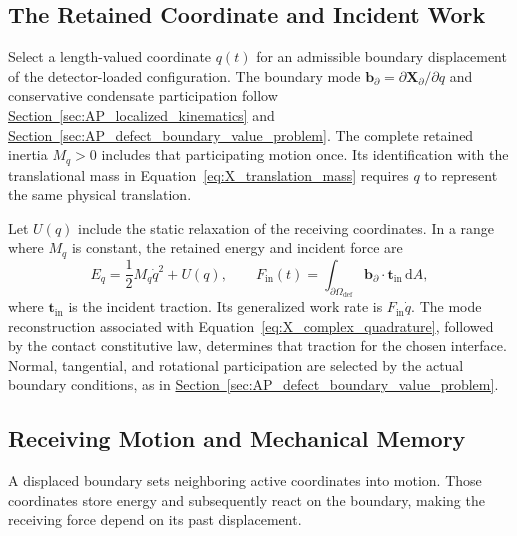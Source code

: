 \subsection{The Retained Coordinate and Incident Work}
\label{sec:Y_boundary_work}

Select a length-valued coordinate $q(t)$ for an admissible boundary displacement of the detector-loaded configuration. The boundary mode $\mathbf b_{\partial}=\partial\mathbf X_{\partial}/\partial q$ and conservative condensate participation follow \hyperref[sec:AP_localized_kinematics]{Section~\ref*{sec:AP_localized_kinematics}} and \hyperref[sec:AP_defect_boundary_value_problem]{Section~\ref*{sec:AP_defect_boundary_value_problem}}. The complete retained inertia $M_q>0$ includes that participating motion once. Its identification with the translational mass in Equation~\eqref{eq:X_translation_mass} requires $q$ to represent the same physical translation.

Let $U(q)$ include the static relaxation of the receiving coordinates. In a range where $M_q$ is constant, the retained energy and incident force are
\begin{equation}
    E_q=\frac12M_q\dot q^2+U(q),
    \qquad
    F_{\mathrm{in}}(t)
    =\int_{\partial\Omega_{\mathrm{def}}}
    \mathbf b_{\partial}\cdot\mathbf t_{\mathrm{in}}\,\mathrm dA,
    \label{eq:Y_local_mechanical_energy}
\end{equation}
where $\mathbf t_{\mathrm{in}}$ is the incident traction. Its generalized work rate is $F_{\mathrm{in}}\dot q$. The mode reconstruction associated with Equation~\eqref{eq:X_complex_quadrature}, followed by the contact constitutive law, determines that traction for the chosen interface. Normal, tangential, and rotational participation are selected by the actual boundary conditions, as in \hyperref[sec:AP_defect_boundary_value_problem]{Section~\ref*{sec:AP_defect_boundary_value_problem}}.

\subsection{Receiving Motion and Mechanical Memory}
\label{sec:Y_receiving_memory}

A displaced boundary sets neighboring active coordinates into motion. Those coordinates store energy and subsequently react on the boundary, making the receiving force depend on its past displacement.

